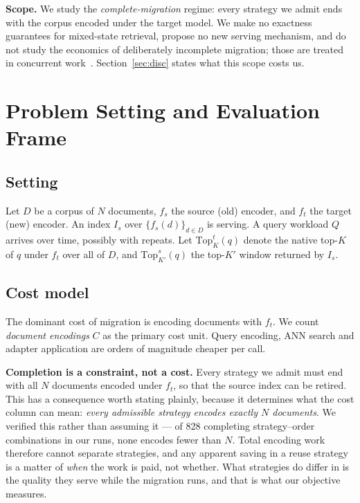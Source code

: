 \documentclass[conference]{IEEEtran}
\newcommand{\topk}{\mathrm{Top}}
\begin{document}
\textbf{Scope.} We study the \emph{complete-migration} regime: every strategy we admit
ends with the corpus encoded under the target model. We make no exactness guarantees
for mixed-state retrieval, propose no new serving mechanism, and do not study the
economics of deliberately incomplete migration; those are treated in concurrent
work~\cite{thaw-anon}. Section~\ref{sec:disc} states what this scope costs us.

\section{Problem Setting and Evaluation Frame}\label{sec:frame}

\subsection{Setting}
Let $D$ be a corpus of $N$ documents, $f_s$ the source (old) encoder, and $f_t$ the
target (new) encoder. An index $I_s$ over $\{f_s(d)\}_{d\in D}$ is serving. A query
workload $Q$ arrives over time, possibly with repeats. Let $\topk_K^{t}(q)$ denote the
native top-$K$ of $q$ under $f_t$ over all of $D$, and $\topk_{K'}^{s}(q)$ the
top-$K'$ window returned by $I_s$.

\subsection{Cost model}
The dominant cost of migration is encoding documents with $f_t$. We count
\emph{document encodings} $C$ as the primary cost unit. Query encoding, ANN search and
adapter application are orders of magnitude cheaper per call.

\textbf{Completion is a constraint, not a cost.} Every strategy we admit must end with
all $N$ documents encoded under $f_t$, so that the source index can be retired. This
has a consequence worth stating plainly, because it determines what the cost column can
mean: \emph{every admissible strategy encodes exactly $N$ documents}. We verified this
rather than assuming it --- of 828 completing strategy--order combinations in our runs,
none encodes fewer than $N$. Total encoding work therefore cannot separate strategies,
and any apparent saving in a reuse strategy is a matter of \emph{when} the work is
paid, not whether. What strategies do differ in is the quality they serve while the
migration runs, and that is what our objective measures.
\end{document}
